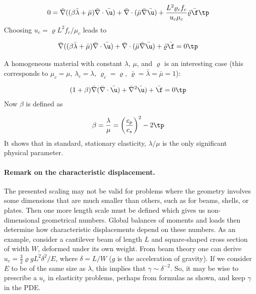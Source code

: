 \documentclass[graybox,envcountchap,sectrefs,final]{svmonodo}
\begin{document}
\[
0 =
\bar \nabla ((\beta\bar\lambda +
\bar\mu)\bar \nabla\cdot\bar \u) +
\bar \nabla\cdot(\bar \mu\bar \nabla\bar \u) +
\frac{L^2\varrho_cf_c}{u_c\mu_c}\bar\varrho\bar\f\tp
\]
Choosing $u_c = \varrho L^2f_c/\mu_c$ leads to

\begin{equation}
\bar \nabla ((\beta\bar\lambda +
\bar\mu)\bar \nabla\cdot\bar \u) +
\bar \nabla\cdot(\bar \mu\bar \nabla\bar \u) +
\bar\varrho\bar\f = 0\tp
\end{equation}

A homogeneous material with constant $\lambda$, $\mu$, and $\varrho$
is an interesting case (this corresponds to $\mu_c=\mu$, $\lambda_c=\lambda$,
$\varrho_c=\varrho$, $\bar\varrho=\bar\lambda=\bar\mu=1$):

\begin{equation}
(1+\beta)\bar \nabla(\bar \nabla\cdot\bar \u) +
\bar \nabla^2\bar \u) +
\bar\f = 0\tp
\end{equation}
Now $\beta$ is defined as

\[ \beta = \frac{\lambda}{\mu} = \left(\frac{c_p}{c_s}\right)^2 - 2\tp\]
It shows that in standard, stationary elasticity, $\lambda/\mu$ is the
only significant physical parameter.

\paragraph{Remark on the characteristic displacement.}

The presented scaling may not be valid for problems where the geometry
involves some dimensions that are much smaller than others, such as for
beams, shells, or plates. Then one more length scale must be defined
which gives us non-dimensional geometrical numbers.  Global balances of
moments and loads then determine how characteristic displacements
depend on these numbers. As an example, consider a cantilever beam of
length $L$ and square-shaped cross section of width $W$, deformed
under its own weight.  From beam theory one can derive $u_c =
\frac{3}{2}\varrho g L^2\delta^2/E$, where $\delta = L/W$ ($g$ is the
acceleration of gravity). If we consider $E$ to be of the same size as
$\lambda$, this implies that $\gamma\sim\delta^{-2}$. So, it may be
wise to prescribe a $u_c$ in elasticity problems, perhaps from
formulas as shown, and keep $\gamma$ in the PDE.
\end{document}
